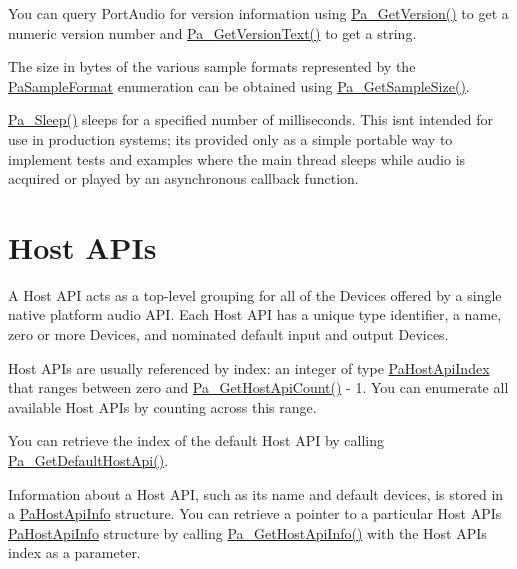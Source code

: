 You can query Port\+Audio for version information using \hyperlink{portaudio_8h_a66da08bcf908e0849c62a6b47f50d7b4}{Pa\+\_\+\+Get\+Version()} to get a numeric version number and \hyperlink{portaudio_8h_a28f3fd9e6d9f933cc695abea71c4b445}{Pa\+\_\+\+Get\+Version\+Text()} to get a string.

The size in bytes of the various sample formats represented by the \hyperlink{portaudio_8h_a4582d93c2c2e60e12be3d74c5fe00b96}{Pa\+Sample\+Format} enumeration can be obtained using \hyperlink{portaudio_8h_a541ed0b734df2631bc4c229acf92abc1}{Pa\+\_\+\+Get\+Sample\+Size()}.

\hyperlink{portaudio_8h_a1b3c20044c9401c42add29475636e83d}{Pa\+\_\+\+Sleep()} sleeps for a specified number of milliseconds. This isn\textquotesingle{}t intended for use in production systems; it\textquotesingle{}s provided only as a simple portable way to implement tests and examples where the main thread sleeps while audio is acquired or played by an asynchronous callback function.\hypertarget{api_overview_host_apis}{}\section{Host A\+P\+Is}\label{api_overview_host_apis}
A Host A\+PI acts as a top-\/level grouping for all of the Devices offered by a single native platform audio A\+PI. Each Host A\+PI has a unique type identifier, a name, zero or more Devices, and nominated default input and output Devices.

Host A\+P\+Is are usually referenced by index\+: an integer of type \hyperlink{portaudio_8h_aeef6da084c57c70aa94be97411e19930}{Pa\+Host\+Api\+Index} that ranges between zero and \hyperlink{portaudio_8h_a19dbdb7c8702e3f4bfc0cdb99dac3dd9}{Pa\+\_\+\+Get\+Host\+Api\+Count()} -\/ 1. You can enumerate all available Host A\+P\+Is by counting across this range.

You can retrieve the index of the default Host A\+PI by calling \hyperlink{portaudio_8h_ae55c77f9b7e3f8eb301a6f1c0e2347ac}{Pa\+\_\+\+Get\+Default\+Host\+Api()}.

Information about a Host A\+PI, such as it\textquotesingle{}s name and default devices, is stored in a \hyperlink{struct_pa_host_api_info}{Pa\+Host\+Api\+Info} structure. You can retrieve a pointer to a particular Host A\+PI\textquotesingle{}s \hyperlink{struct_pa_host_api_info}{Pa\+Host\+Api\+Info} structure by calling \hyperlink{portaudio_8h_a7c650aede88ea553066bab9bbe97ea90}{Pa\+\_\+\+Get\+Host\+Api\+Info()} with the Host A\+PI\textquotesingle{}s index as a parameter.

